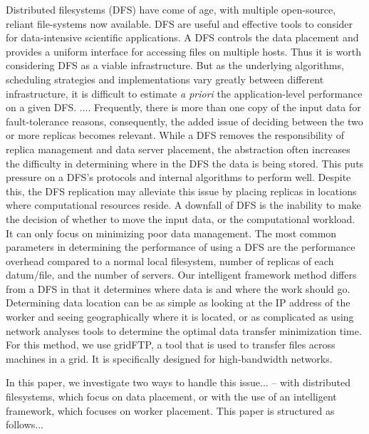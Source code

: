 \documentclass{rspublic}
\newcommand{\micnote}[1]{ {\textcolor{blue} { ***Michael: #1 }}}
\newcommand{\betynote}[1]{ {\textcolor{orange} { ***Bety: #1 }}}
\newcommand{\jhanote}[1]{} \newcommand{\micnote}[1]{}\newcommand{\betynote}[1]{} \newcommand{\fixme}[1]{}
\begin{document}
\jhanote{Compact. Simplify. Possibly move parts to later section; not
 in introduction} Distributed filesystems (DFS) have come of age,
with multiple open-source, reliant file-systems now available. DFS are
useful and effective tools to consider for data-intensive scientific
applications. A DFS controls the data placement and provides a
uniform interface for accessing files on multiple hosts. Thus it is
worth considering DFS as a viable infrastructure. But as the
underlying algorithms, scheduling strategies and implementations vary
greatly between different infrastructure, it is difficult to estimate
{\it a priori} the application-level performance on a given DFS.
.... Frequently, there is more than one copy of the input data for
fault-tolerance reasons, consequently, the added issue of deciding
between the two or more replicas becomes relevant. While a DFS
removes the responsibility of replica management and data server
placement, the abstraction often increases the difficulty in
determining where in the DFS the data is being stored. This puts
pressure on a DFS's protocols and internal algorithms to perform
well. Despite this, the DFS replication may alleviate this issue by
placing replicas in locations where computational resources reside. A
downfall of DFS is the inability to make the decision of whether to
move the input data, or the computational workload. It can only focus
on minimizing poor data management. The most common parameters in
determining the performance of using a DFS are the performance
overhead compared to a normal local filesystem, number of replicas of
each datum/file, and the number of servers. Our intelligent framework
method differs from a DFS in that it determines where data is and
where the work should go. Determining data location can be as simple
as looking at the IP address of the worker and seeing geographically
where it is located, or as complicated as using network analyses tools
to determine the optimal data transfer minimization time. For this
method, we use gridFTP\jhanote{place proper citation for gridftp}, a
tool that is used to transfer files across machines in a grid. It is
specifically designed for high-bandwidth networks.
 
In this paper, we investigate two ways to handle this
issue... \jhanote{which issue?}  -- with distributed filesystems,
which focus on data placement, or with the use of an intelligent
framework, which focuses on worker placement. This paper is structured
as follows...
\end{document}
